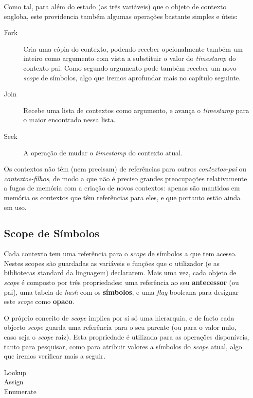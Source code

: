  Como tal, para além do estado (as três variáveis) que o objeto de contexto engloba, este providencia também algumas operações bastante simples e úteis:
 
 \begin{description}
  \item[Fork] Cria uma cópia do contexto, podendo receber opcionalmente também um inteiro como argumento com vista a substituir o valor do \textit{timestamp} do contexto pai. Como segundo argumento pode também receber um novo \textit{scope} de símbolos, algo que iremos aprofundar mais no capítulo seguinte.
  \item[Join] Recebe uma lista de contextos como argumento, e avança o \textit{timestamp} para o maior encontrado nessa lista.
  \item[Seek] A operação de mudar o \textit{timestamp} do contexto atual.
 \end{description}

 Os contextos não têm (nem precisam) de referências para outros \textit{contextos-pai} ou \textit{contextos-filhos}, de modo a que não é preciso grandes preocupações relativamente a fugas de memória com a criação de novos contextos: apenas são mantidos em memória os contextos que têm referências para eles, e que portanto estão ainda em uso.

\subsection{Scope de Símbolos}
Cada contexto tem uma referência para o \textit{scope} de símbolos a que tem acesso. Nestes scopes são guardadas as variáveis e funções que o utilizador (e as bibliotecas standard da linguagem) declararem. Mais uma vez, cada objeto de \textit{scope} é composto por três propriedades: uma referência ao seu \textbf{antecessor} (ou pai), uma tabela de \textit{hash} com os \textbf{símbolos}, e uma \textit{flag} booleana para designar este \textit{scope} como \textbf{opaco}.

O próprio conceito de \textit{scope} implica por si só uma hierarquia, e de facto cada objecto \textit{scope} guarda uma referência para o seu parente (ou para o valor nulo, caso seja o \textit{scope} raiz). Esta propriedade é utilizada para as operações disponíveis, tanto para pesquisar, como para atribuir valores a símbolos do \textit{scope} atual, algo que iremos verificar mais a seguir.

\begin{description}
 \item[Lookup]
 \item[Assign]
 \item[Enumerate]
\end{description}




